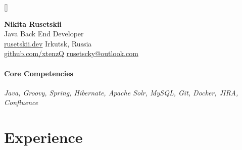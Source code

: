 \documentclass[10pt]{article}
\begin{document}
\titleformat{\section}{\vspace{-8pt}\scshape\raggedright\Large}{}{0em}{}[\color{black}\titlerule \vspace{-8pt}]


\noindent
\Large{\textbf{Nikita Rusetskii}}\vspace{4pt}
\\
\large{Java Back End Developer}\vspace{4pt}
\\
\normalsize\href{https://rusetskii.dev/}{rusetskii.dev}\normalsize
\hfill Irkutsk, Russia
\\
\href{https://github.com/xtenzQ}{github.com/xtenzQ}
\hfill
\href{mailto:rusetscky@outlook.com}{rusetscky@outlook.com}

\paragraph{\noindent\textbf{Core Competencies}\vspace{1pt}}\mbox{}\par\nobreak\noindent
\textit{Java, Groovy, Spring, Hibernate, Apache Solr, MySQL, Git, Docker, JIRA, Confluence}



\section{Experience}
\paragraph{}
\end{document}
